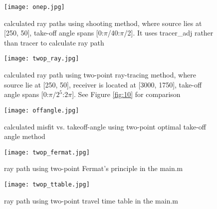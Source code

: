 \documentclass{article}
\begin{document}
\begin{figure}[H]
\centering
\texttt{[image: onep.jpg]}
\caption{calculated ray paths using shooting method, where source lies at [250, 50], take-off angle spans [0:$\pi$/40:$\pi$/2]. It uses tracer\_adj rather than tracer to calculate ray path}
\end{figure}
\begin{figure}[H]
\centering
\texttt{[image: twop\_ray.jpg]}
\caption{calculated ray path using two-point ray-tracing method, where source lie at [250, 50], receiver is located at [3000, 1750], take-off angle spans [0:$\pi/2^{5}$:$2\pi$]. See Figure \ref{fig:10} for comparison}
\label{fig:5}
\end{figure}
\begin{figure}[H]
\centering
\texttt{[image: offangle.jpg]}
\caption{calculated misfit vs. takeoff-angle using two-point optimal take-off angle method}
\end{figure}

\begin{figure}[H]
\centering
\texttt{[image: twop\_fermat.jpg]}
\caption{ray path using two-point Fermat's principle in the main.m}
\end{figure}
\begin{figure}[H]
\centering
\texttt{[image: twop\_ttable.jpg]}
\caption{ray path using two-point travel time table in the main.m}
\end{figure}
\end{document}
